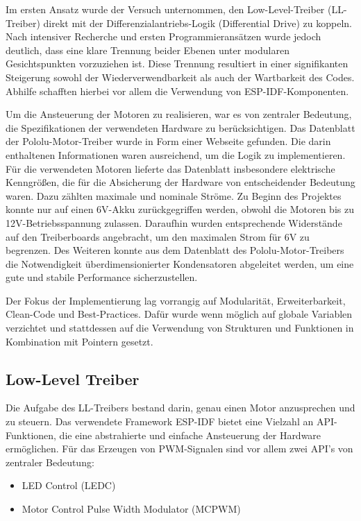 Im ersten Ansatz wurde der Versuch unternommen, den Low-Level-Treiber (LL-Treiber) direkt mit der Differenzialantriebs-Logik (Differential Drive) zu koppeln. Nach intensiver Recherche und ersten Programmieransätzen wurde jedoch deutlich, dass eine klare Trennung beider Ebenen unter modularen Gesichtspunkten vorzuziehen ist. Diese Trennung resultiert in einer signifikanten Steigerung sowohl der Wiederverwendbarkeit als auch der Wartbarkeit des Codes. Abhilfe schafften hierbei vor allem die Verwendung von ESP-IDF-Komponenten.\newline

Um die Ansteuerung der Motoren zu realisieren, war es von zentraler Bedeutung, die Spezifikationen der verwendeten Hardware zu berücksichtigen. Das Datenblatt der Pololu-Motor-Treiber wurde in Form einer Webseite gefunden. Die darin enthaltenen Informationen waren ausreichend, um die Logik zu implementieren. Für die verwendeten Motoren lieferte das Datenblatt insbesondere elektrische Kenngrößen, die für die Absicherung der Hardware von entscheidender Bedeutung waren. Dazu zählten maximale und nominale Ströme. Zu Beginn des Projektes konnte nur auf einen 6V-Akku zurückgegriffen werden, obwohl die Motoren bis zu 12V-Betriebsspannung zulassen. Daraufhin wurden entsprechende Widerstände auf den Treiberboards angebracht, um den maximalen Strom für 6V zu begrenzen. Des Weiteren konnte aus dem Datenblatt des Pololu-Motor-Treibers die Notwendigkeit überdimensionierter Kondensatoren abgeleitet werden, um eine gute und stabile Performance sicherzustellen. \newline

Der Fokus der Implementierung lag vorrangig auf Modularität, Erweiterbarkeit, Clean-Code und Best-Practices. Dafür wurde wenn möglich auf globale Variablen verzichtet und stattdessen auf die Verwendung von Strukturen und Funktionen in Kombination mit Pointern gesetzt.

\subsection{Low-Level Treiber}

Die Aufgabe des LL-Treibers bestand darin, genau einen Motor anzusprechen und zu steuern. Das verwendete Framework ESP-IDF bietet eine Vielzahl an API-Funktionen, die eine abstrahierte und einfache Ansteuerung der Hardware ermöglichen. Für das Erzeugen von PWM-Signalen sind vor allem zwei API's von zentraler Bedeutung:

\begin{itemize}
    \item LED Control (LEDC)
    \item Motor Control Pulse Width Modulator (MCPWM)
\end{itemize}

